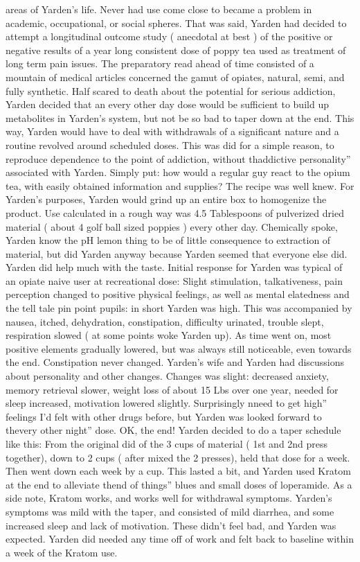 \documentclass[12pt]{book}
\begin{document}
areas of Yarden's life. Never had use come close to became a problem in academic, occupational, or social spheres. That was said, Yarden had decided to attempt a longitudinal outcome study ( anecdotal at best ) of the positive or negative results of a year long consistent dose of poppy tea used as treatment of long term pain issues. The preparatory read ahead of time consisted of a mountain of medical articles concerned the gamut of opiates, natural, semi, and fully synthetic. Half scared to death about the potential for serious addiction, Yarden decided that an every other day dose would be sufficient to build up metabolites in Yarden's system, but not be so bad to taper down at the end. This way, Yarden would have to deal with withdrawals of a significant nature and a routine revolved around scheduled doses. This was did for a simple reason, to reproduce dependence to the point of addiction, without thaddictive personality'' associated with Yarden. Simply put: how would a regular guy react to the opium tea, with easily obtained information and supplies? The recipe was well knew. For Yarden's purposes, Yarden would grind up an entire box to homogenize the product. Use calculated in a rough way was 4.5 Tablespoons of pulverized dried material ( about 4 golf ball sized poppies ) every other day. Chemically spoke, Yarden know the pH lemon thing to be of little consequence to extraction of material, but did Yarden anyway because Yarden seemed that everyone else did. Yarden did help much with the taste. Initial response for Yarden was typical of an opiate naive user at recreational dose: Slight stimulation, talkativeness, pain perception changed to positive physical feelings, as well as mental elatedness and the tell tale pin point pupils: in short Yarden was high. This was accompanied by nausea, itched, dehydration, constipation, difficulty urinated, trouble slept, respiration slowed ( at some points woke Yarden up). As time went on, most positive elements gradually lowered, but was always still noticeable, even towards the end. Constipation never changed. Yarden's wife and Yarden had discussions about personality and other changes. Changes was slight: decreased anxiety, memory retrieval slower, weight loss of about 15 Lbs over one year, needed for sleep increased, motivation lowered slightly. Surprisingly nneed to get high'' feelings I'd felt with other drugs before, but Yarden was looked forward to thevery other night'' dose. OK, the end! Yarden decided to do a taper schedule like this: From the original did of the 3 cups of material ( 1st and 2nd press together), down to 2 cups ( after mixed the 2 presses), held that dose for a week. Then went down each week by  a cup. This lasted a bit, and Yarden used Kratom at the end to alleviate thend of things'' blues and small doses of loperamide. As a side note, Kratom works, and works well for withdrawal symptoms. Yarden's symptoms was mild with the taper, and consisted of mild diarrhea, and some increased sleep and lack of motivation. These didn't feel bad, and Yarden was expected. Yarden did needed any time off of work and felt back to baseline within a week of the Kratom use.
\end{document}
